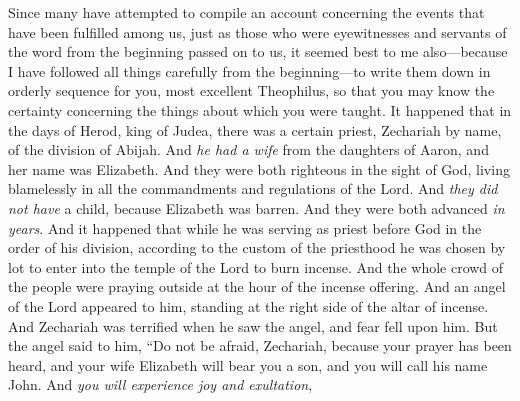 
\begin{biblechapter} %
 Since many have attempted to compile an account concerning the events that have been fulfilled among us,
\verse just as those who were eyewitnesses and servants of the word from the beginning passed on to us,
\verse it seemed best to me also—because I have followed all things carefully from the beginning—to write them down in orderly sequence for you, most excellent Theophilus,
\verse so that you may know the certainty concerning the things about which you were taught.
 It happened that in the days of Herod, king of Judea, there was a certain priest, Zechariah by name, of the division of Abijah. And \textit{he had a wife} from the daughters of Aaron, and her name was Elizabeth.
\verse And they were both righteous in the sight of God, living blamelessly in all the commandments and regulations of the Lord.
\verse And \textit{they did not have} a child, because Elizabeth was barren. And they were both advanced \textit{in years}.
\verse And it happened that while he was serving as priest before God in the order of his division,
\verse according to the custom of the priesthood he was chosen by lot to enter into the temple of the Lord to burn incense.
\verse And the whole crowd of the people were praying outside at the hour of the incense offering.
\verse And an angel of the Lord appeared to him, standing at the right side of the altar of incense.
\verse And Zechariah was terrified when he saw the angel, and fear fell upon him.
\verse But the angel said to him,
\verse “Do not be afraid, Zechariah, 
because your prayer has been heard, 
and your wife Elizabeth will bear you a son, 
and you will call his name John.
\verse And \textit{you will experience joy and exultation}, 

\end{biblechapter}
